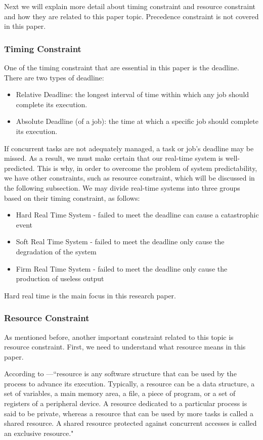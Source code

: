 Next we will explain more detail about timing constraint and resource constraint and how they are related to this paper topic. Precedence constraint is not covered in this paper. 

\subsubsection{Timing Constraint}

One of the timing constraint that are essential in this paper is the deadline. There are two types of deadline\cite{b4}:
\begin{itemize}
\item Relative Deadline: the longest interval of time within which any job should complete its execution.
\item Absolute Deadline (of a job): the time at which a specific job should complete its execution.
\end{itemize}

If concurrent tasks are not adequately managed, a task or job's deadline may be missed. As a result, we must make certain that our real-time system is well-predicted. This is why, in order to overcome the problem of system predictability, we have other constraints, such as resource constraint, which will be discussed in the following subsection. We may divide real-time systems into three groups based on their timing constraint, as follows:

\begin{itemize}
\item Hard Real Time System - failed to meet the deadline can cause a catastrophic event 
\item Soft Real Time System - failed to meet the deadline only cause the degradation of the system 
\item Firm Real Time System - failed to meet the deadline only cause the production of useless output 
\end{itemize}
Hard real time is the main focus in this research paper.

\subsubsection{Resource Constraint}

As mentioned before, another important constraint related to this topic is resource constraint. First, we need to understand what resource means in this paper.

According to \cite{b5}---``resource is any software structure that can be used by the process to advance its execution. Typically, a resource can be a data structure, a set of variables, a main memory area, a file, a piece of program, or a set of registers of a peripheral device. A resource dedicated to a particular process is said to be private, whereas a resource that can be used by more tasks is called a shared resource. A shared resource protected against concurrent accesses is called an exclusive resource."


